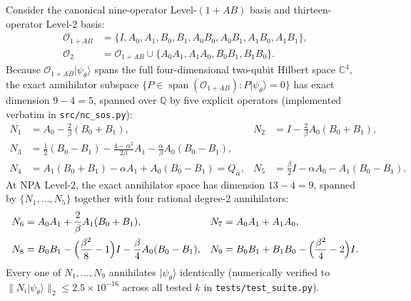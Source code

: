 \documentclass[11pt,a4paper]{article}
\newcommand{\QQ}{\mathbb{Q}}
\begin{document}
Consider the canonical nine-operator Level-$(1+AB)$ basis and thirteen-operator Level-$2$ basis:
\begin{align}
  \mathcal{O}_{1+AB} &= \{I, A_0, A_1, B_0, B_1, A_0 B_0, A_0 B_1, A_1 B_0, A_1 B_1\},\\
  \mathcal{O}_2 &= \mathcal{O}_{1+AB} \cup \{A_0 A_1, A_1 A_0, B_0 B_1, B_1 B_0\}.
\end{align}
Because $\mathcal{O}_{1+AB}|\psi_\theta\rangle$ spans the full four-dimensional two-qubit Hilbert space $\mathbb{C}^4$, the exact annihilator subspace $\{P \in \operatorname{span}(\mathcal{O}_{1+AB}) : P|\psi_\theta\rangle = 0\}$ has exact dimension $9 - 4 = 5$, spanned over $\QQ$ by five explicit operators (implemented verbatim in \texttt{src/nc\_sos.py}):
\begin{align}
  N_1 &= A_0 - \frac{2}{\beta}(B_0 + B_1), &
  N_2 &= I - \frac{2}{\beta} A_0(B_0 + B_1), \label{eq:N12}\\
  N_3 &= \frac{1}{2}(B_0 - B_1) - \frac{4 - \alpha^2}{2\beta} A_1 - \frac{\alpha}{\beta} A_0(B_0 - B_1), \label{eq:N3}\\
  N_4 &= A_1(B_0 + B_1) - \alpha A_1 + A_0(B_0 - B_1) = Q_\alpha, &
  N_5 &= \frac{\beta}{2} I - \alpha A_0 - A_1(B_0 - B_1). \label{eq:N45}
\end{align}
At NPA Level-$2$, the exact annihilator space has dimension $13 - 4 = 9$, spanned by $\{N_1, \dots, N_5\}$ together with four rational degree-$2$ annihilators:
\begin{align}
  N_6 &= A_0 A_1 + \frac{2}{\beta} A_1(B_0 + B_1), &
  N_7 &= A_0 A_1 + A_1 A_0, \label{eq:N67}\\
  N_8 &= B_0 B_1 - \Bigl(\frac{\beta^2}{8} - 1\Bigr) I - \frac{\beta}{4} A_0(B_0 - B_1), &
  N_9 &= B_0 B_1 + B_1 B_0 - \Bigl(\frac{\beta^2}{4} - 2\Bigr) I. \label{eq:N89}
\end{align}
Every one of $N_1, \dots, N_9$ annihilates $|\psi_\theta\rangle$ identically (numerically verified to $\|N_i|\psi_\theta\rangle\|_2 \le 2.5 \times 10^{-16}$ across all tested $k$ in \texttt{tests/test\_suite.py}).
\end{document}
